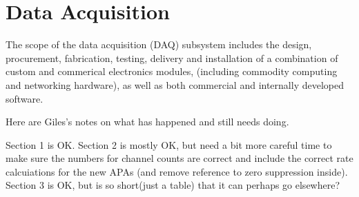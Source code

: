 

\newcommand{\LBNE}{[Expt-name]}

\chapter{Data Acquisition}
\label{ch:trig}

The scope of the data acquisition (DAQ) subsystem includes the 
design, procurement, fabrication, testing, delivery and installation 
of a combination of custom and commerical electronics modules, (including 
commodity computing and networking hardware), as well as both commercial 
and internally developed software.   

\begin{editornote}
Here are Giles's notes on what has happened and still needs doing.

Section 1 is OK.  Section 2 is mostly OK, but need a bit more careful
time to make sure the numbers for channel counts are correct and
include the correct rate calcuiations for the new APAs (and remove
reference to zero suppression inside).  Section 3 is OK, but is so
short(just a table) that it can perhaps go elsewhere?
\end{editornote}

